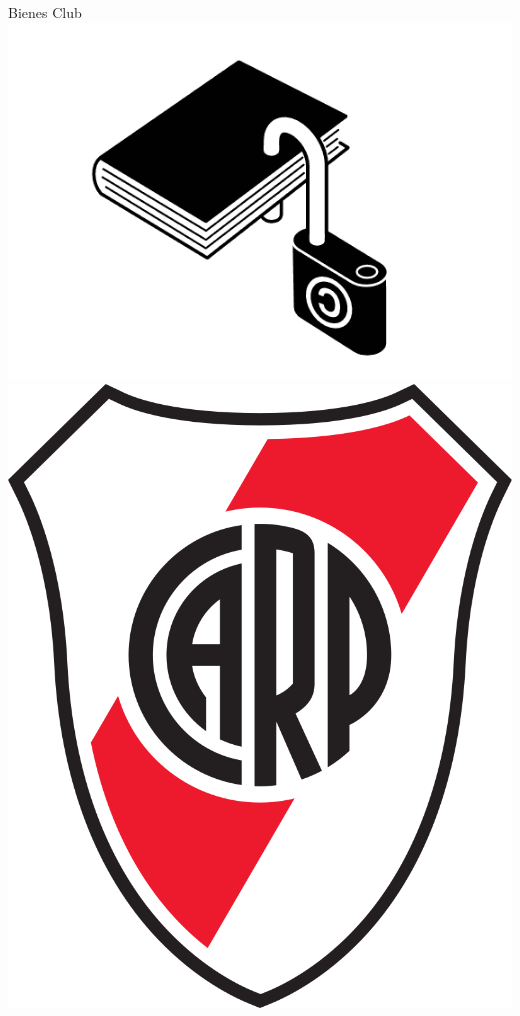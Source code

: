 \documentclass{beamer}
\begin{document}
\begin{frame}{Bienes Club}
    \centering
    \includegraphics[scale=0.2]{../Figures/derechos_autor.png}
    \includegraphics[scale=0.1]{../Figures/Escudo_del_C_A_River_Plate.png}
\end{frame}
\end{document}

